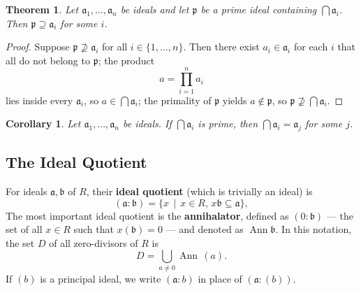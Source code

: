 \documentclass[11pt]{article}
\newtheorem{theorem}{Theorem}
\newtheorem{corollary}{Corollary}
\newcommand{\Ann}{\operatorname{Ann}}
\begin{document}
\begin{adjustwidth}{0.5cm}{}
	\begin{theorem}
		Let $\mathfrak{a}_{1}, \ldots, \mathfrak{a}_{n}$ be ideals and let $\mathfrak{p}$ be a prime ideal containing $\bigcap \mathfrak{a}_{i}$. Then $\mathfrak{p} \supseteq \mathfrak{a}_{i}$ for some $i$. 
	\end{theorem}
	\begin{proof}
		Suppose $\mathfrak{p} \nsupseteq \mathfrak{a}_{i}$ for all $i \in \{ 1, \ldots, n \}$. Then there exist $a_{i} \in \mathfrak{a}_{i}$ for each $i$ that all do not belong to $\mathfrak{p}$; the product
		\[
			a = \prod\limits_{i = 1}^{n} a_{i}
		\]
		lies inside every $\mathfrak{a}_{i}$, so $a \in \bigcap \mathfrak{a}_{i}$; the primality of $\mathfrak{p}$ yields $a \notin \mathfrak{p}$, so $\mathfrak{p} \nsupseteq \bigcap \mathfrak{a}_{i}$.
	\end{proof}
	\begin{corollary}
		Let $\mathfrak{a}_{1}, \ldots, \mathfrak{a}_{n}$ be ideals. If $\bigcap \mathfrak{a}_{i}$ is prime, then $\bigcap \mathfrak{a}_{i} = \mathfrak{a}_{j}$ for some $j$.
	\end{corollary}
\end{adjustwidth}




\subsection{The Ideal Quotient}

For ideals $\mathfrak{a}, \mathfrak{b}$ of $R$, their \textbf{ideal quotient} (which is trivially an ideal) is
\[
	(\mathfrak{a} : \mathfrak{b}) = \{ x \,\mid\, x \in R, \, x \mathfrak{b} \subseteq \mathfrak{a} \},
\]
The most important ideal quotient is the \textbf{annihalator}, defined as $(0 : \mathfrak{b})$ --- the set of all $x \in R$ such that $x (\mathfrak{b}) = 0$ --- and denoted as $\Ann \mathfrak{b}$. In this notation, the set $D$ of all zero-divisors of $R$ is
\[
	D = \bigcup\limits_{a \ne 0} \Ann \, (a).
\]
If $(b)$ is a principal ideal, we write $(\mathfrak{a} : b)$ in place of $(\mathfrak{a} : (b))$.
\end{document}
